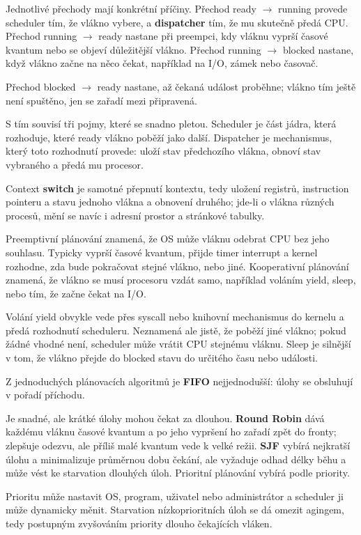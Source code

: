 \documentclass[11pt,a4paper]{article}
\begin{document}
Jednotlivé přechody mají konkrétní příčiny. Přechod ready $\rightarrow$ running provede scheduler tím, že vlákno vybere, a \textbf{dispatcher} tím, že mu skutečně předá CPU. Přechod running $\rightarrow$ ready nastane při preempci, kdy vláknu vyprší časové kvantum nebo se objeví důležitější vlákno. Přechod running $\rightarrow$ blocked nastane, když vlákno začne na něco čekat, například na I/O, zámek nebo časovač.

Přechod blocked $\rightarrow$ ready nastane, až čekaná událost proběhne; vlákno tím ještě není spuštěno, jen se zařadí mezi připravená.

S tím souvisí tři pojmy, které se snadno pletou. Scheduler je část jádra, která rozhoduje, které ready vlákno poběží jako další. Dispatcher je mechanismus, který toto rozhodnutí provede: uloží stav předchozího vlákna, obnoví stav vybraného a předá mu procesor.

Context \textbf{switch} je samotné přepnutí kontextu, tedy uložení registrů, instruction pointeru a stavu jednoho vlákna a obnovení druhého; jde-li o vlákna různých procesů, mění se navíc i adresní prostor a stránkové tabulky.

Preemptivní plánování znamená, že OS může vláknu odebrat CPU bez jeho souhlasu. Typicky vyprší časové kvantum, přijde timer interrupt a kernel rozhodne, zda bude pokračovat stejné vlákno, nebo jiné. Kooperativní plánování znamená, že vlákno se musí procesoru vzdát samo, například voláním yield, sleep, nebo tím, že začne čekat na I/O.

Volání yield obvykle vede přes syscall nebo knihovní mechanismus do kernelu a předá rozhodnutí scheduleru. Neznamená ale jistě, že poběží jiné vlákno; pokud žádné vhodné není, scheduler může vrátit CPU stejnému vláknu. Sleep je silnější v tom, že vlákno přejde do blocked stavu do určitého času nebo události.

Z jednoduchých plánovacích algoritmů je \textbf{FIFO} nejjednodušší: úlohy se obsluhují v pořadí příchodu.

Je snadné, ale krátké úlohy mohou čekat za dlouhou. \textbf{Round Robin} dává každému vláknu časové kvantum a po jeho vypršení ho zařadí zpět do fronty; zlepšuje odezvu, ale příliš malé kvantum vede k velké režii. \textbf{SJF} vybírá nejkratší úlohu a minimalizuje průměrnou dobu čekání, ale vyžaduje odhad délky běhu a může vést ke starvation dlouhých úloh. Prioritní plánování vybírá podle priority.

Prioritu může nastavit OS, program, uživatel nebo administrátor a scheduler ji může dynamicky měnit. Starvation nízkoprioritních úloh se dá omezit agingem, tedy postupným zvyšováním priority dlouho čekajících vláken.
\end{document}
